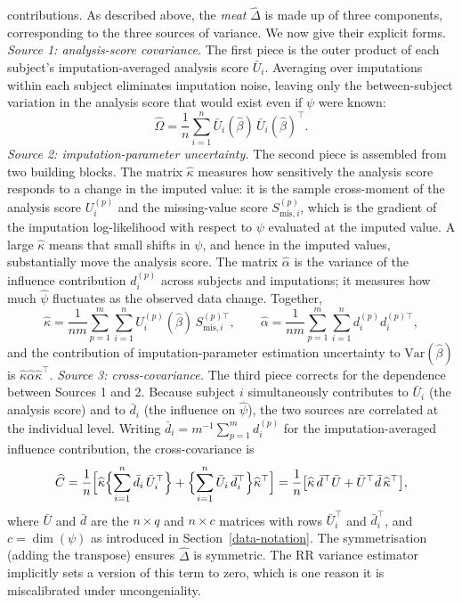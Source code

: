 contributions.
As described above, the \emph{meat} \(\widehat\Delta\) is made up of three
components, corresponding to the three sources of variance.  We now give
their explicit forms.
\medskip
\noindent\textit{Source 1: analysis-score covariance.}\enskip
The first piece is the outer product of each subject's
imputation-averaged analysis score \(\bar U_i\).  Averaging over
imputations within each subject eliminates imputation noise, leaving
only the between-subject variation in the analysis score that would
exist even if \(\psi\) were known:
\[
\widehat\Omega
=
\frac{1}{n}\sum_{i=1}^n
\bar U_i(\hat\beta)\,\bar U_i(\hat\beta)^\top.
\]
\medskip
\noindent\textit{Source 2: imputation-parameter uncertainty.}\enskip
The second piece is assembled from two building blocks.  The matrix
\(\widehat\kappa\) measures how sensitively the analysis score responds
to a change in the imputed value: it is the sample cross-moment of the
analysis score \(U_i^{(p)}\) and the missing-value score
\(S_{\mathrm{mis},i}^{(p)}\), which is the gradient of the imputation
log-likelihood with respect to \(\psi\) evaluated at the imputed value.
A large \(\widehat\kappa\) means that small shifts in \(\psi\), and hence in the imputed values, substantially move the analysis score. The matrix \(\widehat\alpha\) is the variance of the influence contribution \(d_i^{(p)}\) across subjects and imputations; it measures
how much \(\hat\psi\) fluctuates as the observed data change.  Together,
\[
\widehat\kappa
=
\frac{1}{nm}\sum_{p=1}^m\sum_{i=1}^n
U_i^{(p)}(\hat\beta)\,S_{\mathrm{mis},i}^{(p)\top},
\qquad
\widehat\alpha
=
\frac{1}{nm}\sum_{p=1}^m\sum_{i=1}^n
d_i^{(p)}d_i^{(p)\top},
\]
and the contribution of imputation-parameter estimation uncertainty to
\(\mathrm{Var}(\hat\beta)\) is \(\widehat\kappa\widehat\alpha\widehat\kappa^\top\).
\medskip
\noindent\textit{Source 3: cross-covariance.}\enskip
The third piece corrects for the dependence between Sources 1 and 2.
Because subject \(i\) simultaneously contributes to \(\bar U_i\) (the
analysis score) and to \(\bar d_i\) (the influence on \(\hat\psi\)),
the two sources are correlated at the individual level.  Writing
\(\bar d_i = m^{-1}\sum_{p=1}^m d_i^{(p)}\) for the
imputation-averaged influence contribution, the cross-covariance is
\[
\widehat C
=
\frac{1}{n}
\Bigl[
\widehat\kappa
\Bigl\{\sum_{i=1}^n \bar d_i\,\bar U_i^\top\Bigr\}
+
\Bigl\{\sum_{i=1}^n \bar U_i\,\bar d_i^\top\Bigr\}
\widehat\kappa^\top
\Bigr]
=
\frac{1}{n}
\bigl[
\widehat\kappa\,\bar d^\top \bar U
+
\bar U^\top\bar d\,\widehat\kappa^\top
\bigr],
\]
where \(\bar U\) and \(\bar d\) are the \(n\times q\) and \(n\times c\)
matrices with rows \(\bar U_i^\top\) and \(\bar d_i^\top\), and
\(c=\dim(\psi)\) as introduced in Section~\ref{data-notation}.  The
symmetrisation (adding the transpose) ensures \(\widehat\Delta\) is
symmetric.  The RR variance estimator implicitly sets a version of this
term to zero, which is one reason it is miscalibrated under
uncongeniality.